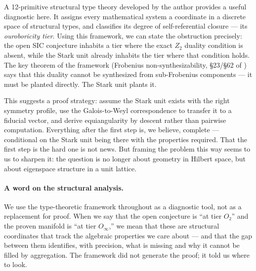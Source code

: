 \documentclass[12pt]{article}
\theoremstyle{plain}
\theoremstyle{definition}
\theoremstyle{remark}
\begin{document}
A 12-primitive structural type theory developed by the author \cite{synthref} provides a useful diagnostic here. It assigns every mathematical system a coordinate in a discrete space of structural types, and classifies its degree of self-referential closure — its \emph{ouroboricity tier}. Using this framework, we can state the obstruction precisely: the open SIC conjecture inhabits a tier where the exact $Z_2$ duality condition is absent, while the Stark unit already inhabits the tier where that condition holds. The key theorem of the framework (Frobenius non-synthesizability, §23/§62 of \cite{synthref}) says that this duality cannot be synthesized from sub-Frobenius components — it must be planted directly. The Stark unit plants it.

This suggests a proof strategy: assume the Stark unit exists with the right symmetry profile, use the Galois-to-Weyl correspondence to transfer it to a fiducial vector, and derive equiangularity by descent rather than pairwise computation. Everything after the first step is, we believe, complete — conditional on the Stark unit being there with the properties required. That the first step is the hard one is not news. But framing the problem this way seems to us to sharpen it: the question is no longer about geometry in Hilbert space, but about eigenspace structure in a unit lattice.

\paragraph{A word on the structural analysis.} We use the type-theoretic framework \cite{synthref} throughout as a diagnostic tool, not as a replacement for proof. When we say that the open conjecture is ``at tier $O₂$'' and the proven manifold is ``at tier $O_\infty$,'' we mean that these are structural coordinates that track the algebraic properties we care about — and that the gap between them identifies, with precision, what is missing and why it cannot be filled by aggregation. The framework did not generate the proof; it told us where to look.
\end{document}
